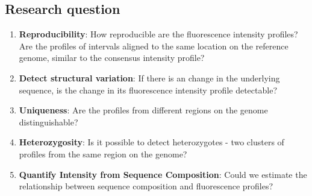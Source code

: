\subsection*{Research question}
\begin{enumerate}
\item {\bf{Reproducibility}}: How reproducible are the fluorescence intensity profiles? Are the profiles of intervals aligned to the same location on the reference genome, similar to the consensus intensity profile?
\item {\bf{Detect structural variation}}: If there is an change in the underlying sequence, is the change in its fluorescence intensity profile detectable?
\item {\bf{Uniqueness}}: Are the profiles from different regions on the genome distinguishable? 
\item {\bf{Heterozygosity}}: Is it possible to detect heterozygotes - two clusters of profiles from the same region on the genome?
\item {\bf{Quantify Intensity from Sequence Composition}}: Could we estimate the relationship between sequence composition and fluorescence profiles?
\end{enumerate}

